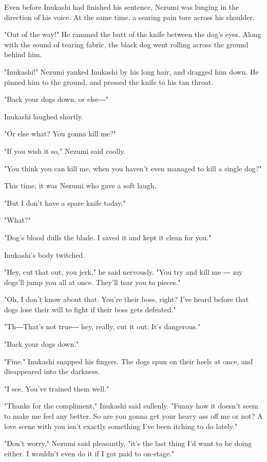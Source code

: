 Even before Inukashi had finished his sentence, Nezumi was lunging in
the direction of his voice. At the same time, a searing pain tore across
his shoulder.

"Out of the way!" He rammed the butt of the knife between the dog's
eyes. Along with the sound of tearing fabric, the black dog went rolling
across the ground behind him.

"Inukashi!" Nezumi yanked Inukashi by his long hair, and dragged him
down. He pinned him to the ground, and pressed the knife to his tan
throat.

"Back your dogs down, or else―"

Inukashi laughed shortly.

"Or else what? You gonna kill me?"

"If you wish it so," Nezumi said coolly.

"You think you can kill me, when you haven't even managed to kill a
single dog?"

This time, it was Nezumi who gave a soft laugh.

"But I don't have a spare knife today."

"What?"

"Dog's blood dulls the blade. I saved it and kept it clean for you."

Inukashi's body twitched.

"Hey, cut that out, you jerk," he said nervously. "You try and kill me ―
my dogs'll jump you all at once. They'll tear you to pieces."

"Oh, I don't know about that. You're their boss, right? I've heard
before that dogs lose their will to fight if their boss gets defeated."

"Th―That's not true― hey, really, cut it out. It's dangerous."

"Back your dogs down."

"Fine." Inukashi snapped his fingers. The dogs spun on their heels at
once, and disappeared into the darkness.

"I see. You've trained them well."

"Thanks for the compliment," Inukashi said sullenly. "Funny how it
doesn't seem to make me feel any better. So are you gonna get your heavy
ass off me or not? A love scene with you isn't exactly something I've
been itching to do lately."

"Don't worry," Nezumi said pleasantly, "it's the last thing I'd want to
be doing either. I wouldn't even do it if I got paid to on-stage."

